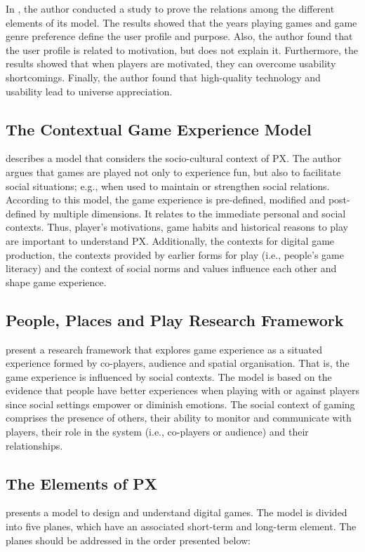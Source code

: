 In \autocite{Fernandez}, the author conducted a study to prove the relations among the different elements of its model. The results showed that the years playing games and game genre preference define the user profile and purpose. Also, the author found that the user profile is related to motivation, but does not explain it. Furthermore, the results showed that when players are motivated, they can overcome usability shortcomings. Finally, the author found that high-quality technology and usability lead to universe appreciation.

\subsection{The Contextual Game Experience Model}
\textcite{Mayra} describes a model that considers the socio-cultural context of \ac{PX}. The author argues that games are played not only to experience fun, but also to facilitate social situations; e.g., when used to maintain or strengthen social relations. According to this model, the game experience is pre-defined, modified and post-defined by multiple dimensions. It relates to the immediate personal and social contexts. Thus, player's motivations, game habits and historical reasons to play are important to understand \ac{PX}. Additionally, the contexts for digital game production, the contexts provided by earlier forms for play (i.e., people's game literacy) and the context of social norms and values influence each other and shape game experience.

\subsection{People, Places and Play Research Framework}
\textcite{DeKort2007b} present a research framework that explores game experience as a situated experience formed by co-players, audience and spatial organisation. That is, the game experience is influenced by social contexts. The model is based on the evidence that people have better experiences when playing with or against players since social settings empower or diminish emotions. The social context of gaming comprises the presence of others, their ability to monitor and communicate with players, their role in the system (i.e., co-players or audience) and their relationships.

\subsection{The Elements of \ac{PX}}
\textcite{Ferrara} presents a model to design and understand digital games. The model is divided into five planes, which have an associated short-term and long-term element. The planes should be addressed in the order presented below:


